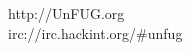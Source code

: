 \documentclass[
    headinclude=false,
    footinclude=false,
    paper=A3,
    paper=portrait,
    pagesize
]{scrartcl}
\begin{document}
    \vfill{}

    \begin{mdframed}[style=mdunfugblank]
        \begin{center}
            \begin{huge}
                http://UnFUG.org \\
                irc://irc.hackint.org/\#unfug
            \end{huge}
        \end{center}
    \end{mdframed}
\end{document}
